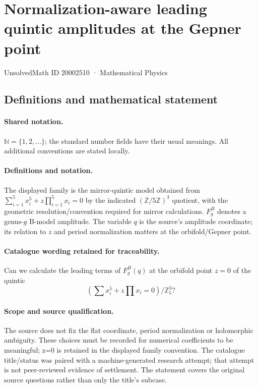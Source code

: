 \documentclass[11pt]{article}
\begin{document}
\setcounter{section}{20002509}
\section{Normalization-aware leading quintic amplitudes at the Gepner point}\label{20002510}
{\small UnsolvedMath ID 20002510 · Mathematical Physics}
\subsection{Definitions and mathematical statement}

\paragraph{Shared notation.}$\mathbb N=\{1,2,\ldots\}$; the standard number fields have their usual meanings. All additional conventions are stated locally.


\paragraph{Definitions and notation.}The displayed family is the mirror-quintic model obtained from $\sum_{i=1}^5x_i^5+z\prod_{i=1}^5x_i=0$ by the indicated $(\mathbb Z/5\mathbb Z)^3$ quotient, with the geometric resolution/convention required for mirror calculations. $F_g^B$ denotes a genus-$g$ B-model amplitude. The variable $q$ is the source’s amplitude coordinate; its relation to $z$ and period normalization matters at the orbifold/Gepner point.

\paragraph{Catalogue wording retained for traceability.}
Can we calculate the leading terms of $F_g^B(q)$ at the orbifold point $z=0$ of the quintic
\[
(\sum x_i^5 + z \prod x_i =0 )/ \mathbb{Z}_5^3?
\]
\paragraph{Scope and source qualification.}The source does not fix the flat coordinate, period normalization or holomorphic ambiguity. These choices must be recorded for numerical coefficients to be meaningful; z=0 is retained in the displayed family convention. The catalogue title/status was paired with a machine-generated research attempt; that attempt is not peer-reviewed evidence of settlement. The statement covers the original source questions rather than only the title’s subcase.
\end{document}
